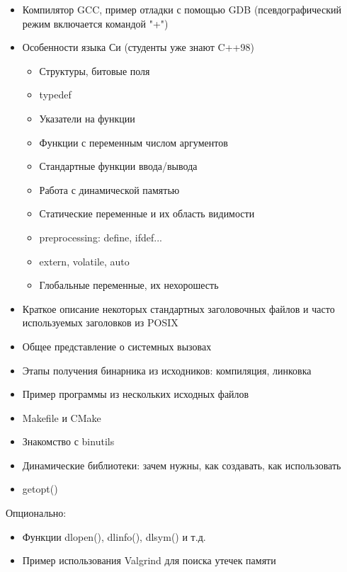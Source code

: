 \documentclass{article}
\begin{document}
    \begin{itemize}
        \item Компилятор GCC, пример отладки с помощью GDB (псевдографический режим включается командой "+")
        \item Особенности языка Си (студенты уже знают C++98)
        \begin{itemize}
            \item Структуры, битовые поля
            \item typedef
            \item Указатели на функции
            \item Функции с переменным числом аргументов
            \item Стандартные функции ввода/вывода
            \item Работа с динамической памятью
            \item Статические переменные и их область видимости
            \item     preprocessing: define, ifdef...
            \item    extern, volatile, auto
            \item   Глобальные переменные, их нехорошесть
        \end{itemize}
        \item Краткое описание некоторых стандартных заголовочных файлов и часто используемых заголовков из POSIX
        \item Общее представление о системных вызовах
        \item Этапы получения бинарника из исходников: компиляция, линковка
        \item Пример программы из нескольких исходных файлов
        \item Makefile и CMake
        \item Знакомство с binutils
        \item Динамические библиотеки: зачем нужны, как создавать, как использовать
        \item getopt()
    \end{itemize}

    Опционально:
        \begin{itemize}
            \item Функции dlopen(), dlinfo(), dlsym() и т.д.
            \item Пример использования Valgrind для поиска утечек памяти
        \end{itemize}
\end{document}
